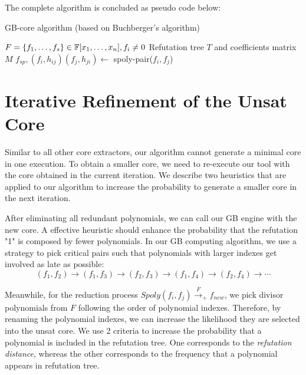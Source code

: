 The complete algorithm is concluded as pseudo code below:

\begin{algorithm}[H]
 \caption{GB-core algorithm (based on Buchberger's algorithm)}
 \label{algo:gbcore}
 \begin{algorithmic}[1]

 \REQUIRE $F = \{f_1, \dots, f_s\} \in {\mathbb{F}}[x_1, \dots, x_n], f_i\neq 0$
 \ENSURE Refutation tree $T$ and coefficients matrix $M$
 	\STATE  $f_{sp},(f_{i},h_{ij})(f_{j},h_{ji}) \gets$ spoly-pair($f_i,f_j$) 
 	\ENDIF
 	\ENDIF
 \ENDFOR
 \end{algorithmic}
 \end{algorithm}



\section{Iterative Refinement of the Unsat Core}
Similar to all other core extractors, our algorithm cannot generate a
minimal core in one execution. To obtain a smaller core, we need to
re-execute our tool with the core obtained in the current
iteration. We describe two heuristics that are applied to our
algorithm to increase the probability to generate a smaller core in
the next iteration. 

After eliminating all redundant polynomials, we can call our GB engine
with the new core. A effective heuristic should enhance the
probability that the refutation "1" is composed by fewer polynomials. 
In our GB computing algorithm, we use a strategy to pick critical
pairs such that polynomials with  larger indexes get involved as late
as possible: 
$$(f_1,f_2)\to(f_1,f_3)\to(f_2,f_3)\to(f_1,f_4)\to(f_2,f_4)\to\cdots$$

Meanwhile, for the reduction process $Spoly(f_i,f_j)\xrightarrow{F}_+
f_{new}$, we pick divisor polynomials from $F$ following the order of
polynomial indexes. Therefore, by renaming the polynomial indexes, we
can increase the likelihood they are selected into the unsat core. 
We use 2 criteria to increase the probability that a polynomial is
included in the refutation tree.  One corresponds to the \emph{refutation distance},
whereas the other corresponds to the frequency that
a polynomial appears in refutation tree. 

